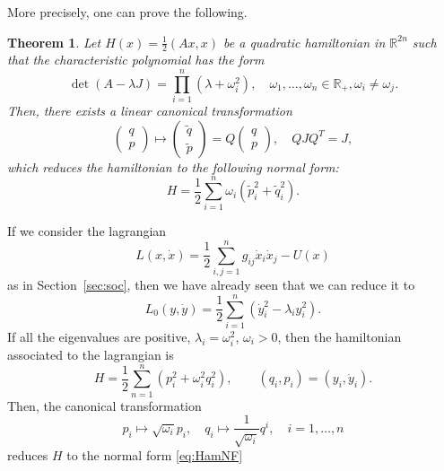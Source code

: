 \documentclass[english,fontsize=11pt,paper=a5,oneside]{scrbook}
\newcommand{\R}{\mathbb{R}}
\newtheorem{theorem}{Theorem}[chapter]
\theoremstyle{definition}
\newenvironment{example}
  {\pushQED{\qed}\renewcommand{\qedsymbol}{$\lozenge$}\examplex}
  {\popQED\endexamplex}
\begin{document}
More precisely, one can prove the following.
\begin{theorem}
    Let $H(x) = \frac12(Ax,x)$ be a quadratic hamiltonian in $\R^{2n}$
    such that the characteristic polynomial has the form
    \begin{equation}
        \det(A-\lambda J) = \prod_{i=1}^n(\lambda + \omega_i^2), \quad \omega_1, \ldots, \omega_n \in \R_+, \omega_i\neq\omega_j.
    \end{equation}
    Then, there exists a linear canonical transformation
    \begin{equation}
        \begin{pmatrix}
            q \\ p
        \end{pmatrix}
        \mapsto
        \begin{pmatrix}
            \tilde q \\ \tilde p 
        \end{pmatrix}
        = Q
        \begin{pmatrix}
            q \\ p
        \end{pmatrix},
        \quad QJQ^T = J,
    \end{equation}
    which reduces the hamiltonian to the following \emph{normal form}:
    \begin{equation}\label{eq:HamNF}
        H = \frac12 \sum_{i=1}^n \omega_i(\tilde p_i^2 + \tilde q_i^2).
    \end{equation}
\end{theorem}

\begin{example}
    If we consider the lagrangian
\begin{equation}
    L(x,\dot x) = \frac12 \sum_{i,j=1}^n g_{ij}\dot x_i \dot x_j - U(x)
\end{equation}
as in Section~\ref{sec:soc}, then we have already seen that we can reduce it to
\begin{equation}
    L_0(y,\dot y) = \frac12 \sum_{i=1}^n(\dot y_i^2 - \lambda_i y_i^2).
\end{equation}
If all the eigenvalues are positive, $\lambda_i = \omega_i^2$, $\omega_i > 0$, then the hamiltonian associated to the lagrangian is
\begin{equation}
    H = \frac12 \sum_{n=1}^n(p_i^2 + \omega_i^2 q_i^2), \qquad (q_i, p_i) = (y_i, \dot y_i).
\end{equation}
Then, the canonical transformation
\begin{equation}
    p_i \mapsto \sqrt{\omega_i}p_i, \quad q_i \mapsto \frac{1}{\sqrt{\omega_i}}q^i, \quad i=1,\ldots,n
\end{equation}
reduces $H$ to the normal form \eqref{eq:HamNF}
\end{example}
\end{document}
